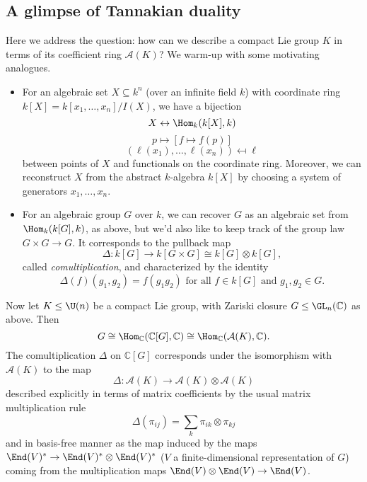 \documentclass[reqno]{amsart} 
\begin{document}
\subsection{A glimpse of Tannakian duality}\label{sec:cnh2voudxb}
Here we address the question: how can we describe a compact Lie group $K$ in terms of its coefficient ring $\mathcal{A}(K)$?  We warm-up with some motivating analogues.
\begin{itemize}
\item For an algebraic set $X \subseteq k^n$ (over an infinite field $k$) with coordinate ring $k[X] = k[x_1,\dotsc,x_n]/I(X)$, we have a bijection
  \begin{equation*}
    X \leftrightarrow \Hom_k(k[X],k)
  \end{equation*}
  \begin{equation*}
    p \mapsto [f \mapsto f(p)]
  \end{equation*}
  \begin{equation*}
    (\ell(x_1),\dotsc,\ell(x_n)) \mapsfrom \ell
  \end{equation*}
  between points of $X$ and functionals on the coordinate ring.  Moreover, we can reconstruct $X$ from the abstract $k$-algebra $k[X]$ by choosing a system of generators $x_1,\dotsc,x_n$.
\item For an algebraic group $G$ over $k$, we can recover $G$ as an algebraic set from $\Hom_k(k[G],k)$, as above, but we'd also like to keep track of the group law $G \times G \rightarrow G$.  It corresponds to the pullback map
  \begin{equation*}
\Delta : k[G] \rightarrow k[G \times G] \cong k[G] \otimes k[G],
\end{equation*}
  called \emph{comultiplication}, and characterized by the identity
  \begin{equation*}
    \Delta(f)(g_1,g_2) = f(g_1 g_2) \text{ for all } f \in k[G] \text{ and } g_1,g_2 \in G.
  \end{equation*}
\end{itemize}

Now let $K \leq \U(n)$ be a compact Lie group, with Zariski closure $G \leq \GL_n(\mathbb{C})$ as above.  Then
\begin{equation}\label{eq:G-via-tannaka}
  G \cong \Hom_{\mathbb{C}}(\mathbb{C}[G],\mathbb{C}) \cong \Hom_{\mathbb{C}}(\mathcal{A}(K),\mathbb{C}).
\end{equation}
The comultiplication $\Delta$ on $\mathbb{C}[G]$ corresponds under the isomorphism with $\mathcal{A}(K)$ to the map
\begin{equation*}
  \Delta : \mathcal{A}(K) \rightarrow \mathcal{A}(K) \otimes \mathcal{A}(K)
\end{equation*}
described explicitly in terms of matrix coefficients by the usual matrix multiplication rule
\begin{equation*}
  \Delta(\pi_{i j}) = \sum_{k} \pi_{i k} \otimes \pi_{k j}
\end{equation*}
and in basis-free manner as the map induced by the maps $\End(V)^* \rightarrow \End(V)^* \otimes \End(V)^*$ ($V$ a finite-dimensional representation of $G$) coming from the multiplication maps $\End(V) \otimes \End(V) \rightarrow \End(V)$.
\end{document}
